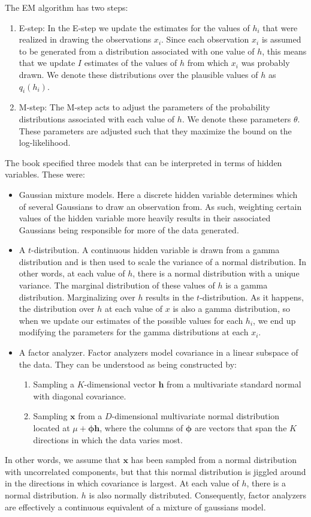 \documentclass[idxtotoc,hyperref,openany]{labbook} %
\begin{document}
The EM algorithm has two steps:
\begin{enumerate}
	\item E-step: In the E-step we update the estimates for the values of $h_i$ that were realized in drawing the observations $x_i$. Since each observation $x_i$ is assumed to be generated from a distribution associated with one value of $h$, this means that we update $I$ estimates of the values of $h$ from which $x_i$ was probably drawn. We denote these distributions over the plausible values of $h$ as $q_i(h_i)$.
	\item M-step: The M-step acts to adjust the parameters of the probability distributions associated with each value of $h$. We denote these parameters $\theta$. These parameters are adjusted such that they maximize the bound on the log-likelihood.
\end{enumerate}

The book specified three models that can be interpreted in terms of hidden variables. These were:
\begin{itemize}
	\item Gaussian mixture models. Here a discrete hidden variable determines which of several Gaussians to draw an observation from. As such, weighting certain values of the hidden variable more heavily results in their associated Gaussians being responsible for more of the data generated.
	\item A $t$-distribution. A continuous hidden variable is drawn from a gamma distribution and is then used to scale the variance of a normal distribution. In other words, at each value of $h$, there is a normal distribution with a unique variance. The marginal distribution of these values of $h$ is a gamma distribution. Marginalizing over $h$ results in the $t$-distribution. As it happens, the distribution over $h$ at each value of $x$ is also a gamma distribution, so when we update our estimates of the possible values for each $h_i$, we end up modifying the parameters for the gamma distributions at each $x_i$.
	\item A factor analyzer. Factor analyzers model covariance in a linear subspace of the data. They can be understood as being constructed by:
	\begin{enumerate}
		\item Sampling a $K$-dimensional vector $\mathbf{h}$ from a multivariate standard normal with diagonal covariance.
		\item Sampling $\mathbf{x}$ from a $D$-dimensional multivariate normal distribution located at $\mu + \mathbf{\phi}\mathbf{h}$, where the columns of $\mathbf{\phi}$ are vectors that span the $K$ directions in which the data varies most.
	\end{enumerate} 
\end{itemize}
	In other words, we assume that $\mathbf{x}$ has been sampled from a normal distribution with uncorrelated components, but that this normal distribution is jiggled around in the directions in which covariance is largest. At each value of $h$, there is a normal distribution. $h$ is also normally distributed. Consequently, factor analyzers are effectively a continuous equivalent of a mixture of gaussians model.
	
\end{document}
